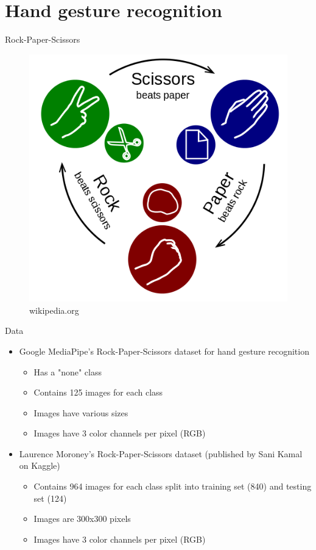 
\section{Hand gesture recognition}

\begin{frame}{Rock-Paper-Scissors}
  \begin{figure}
	\includegraphics[width=\linewidth,height=0.75\textheight,keepaspectratio]{images/502px-Rock-paper-scissors.svg.png}
	\caption{wikipedia.org}
  \end{figure}
\end{frame}

\begin{frame}{Data}
  \begin{itemize}
	\item Google MediaPipe's Rock-Paper-Scissors dataset for hand gesture
	recognition
	  \begin{itemize}
		\item Has a "none" class
		\item Contains 125 images for each class
		\item Images have various sizes
		\item Images have 3 color channels per pixel (RGB)
	  \end{itemize}
	\item Laurence Moroney's Rock-Paper-Scissors dataset (published by Sani
	Kamal on Kaggle)
	  \begin{itemize}
		\item Contains 964 images for each class split into training set (840) and testing set (124)
		\item Images are 300x300 pixels
		\item Images have 3 color channels per pixel (RGB)
	  \end{itemize}
  \end{itemize}
\end{frame}

